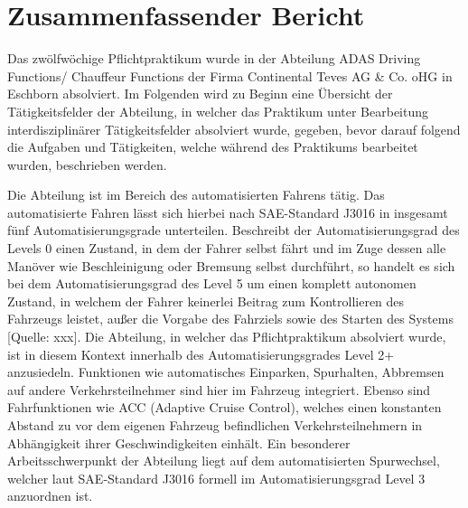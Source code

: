 \chapter{Zusammenfassender Bericht}
\label{sec.zusammenfassender_bericht}
Das zwölfwöchige Pflichtpraktikum wurde in der Abteilung ADAS Driving Functions/ Chauffeur Functions der Firma Continental Teves AG \& Co. oHG in Eschborn absolviert. Im Folgenden wird zu Beginn eine Übersicht der Tätigkeitsfelder der Abteilung, in welcher das Praktikum unter Bearbeitung interdisziplinärer Tätigkeitsfelder absolviert wurde, gegeben, bevor darauf folgend die Aufgaben und Tätigkeiten, welche während des Praktikums bearbeitet wurden, beschrieben werden. 

Die Abteilung ist im Bereich des automatisierten Fahrens tätig. Das automatisierte Fahren lässt sich hierbei nach SAE-Standard J3016 in insgesamt fünf Automatisierungsgrade unterteilen. Beschreibt der Automatisierungsgrad des Levels 0 einen Zustand, in dem der Fahrer selbst fährt und im Zuge dessen alle Manöver wie Beschleinigung oder Bremsung selbst durchführt, so handelt es sich bei dem Automatisierungsgrad des Level 5 um einen komplett autonomen Zustand, in welchem der Fahrer keinerlei Beitrag zum Kontrollieren des Fahrzeugs leistet, außer die Vorgabe des Fahrziels sowie des Starten des Systems [Quelle: xxx]. Die Abteilung, in welcher das Pflichtpraktikum absolviert wurde, ist in diesem Kontext innerhalb des Automatisierungsgrades Level 2+ anzusiedeln. Funktionen wie automatisches Einparken, Spurhalten, Abbremsen auf andere Verkehrsteilnehmer sind hier im Fahrzeug integriert. Ebenso sind Fahrfunktionen wie ACC (Adaptive Cruise Control), welches einen konstanten Abstand zu vor dem eigenen Fahrzeug befindlichen Verkehrsteilnehmern in Abhängigkeit ihrer Geschwindigkeiten einhält. Ein besonderer Arbeitsschwerpunkt der Abteilung liegt auf dem automatisierten Spurwechsel, welcher laut SAE-Standard J3016 formell im Automatisierungsgrad Level 3 anzuordnen ist.

